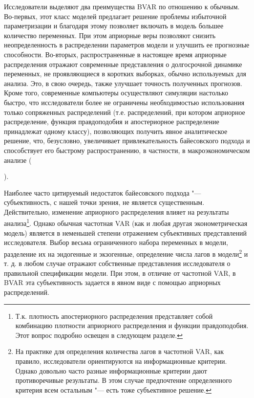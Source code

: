 \documentclass[11pt]{article} %
\newcommand{\eng}[1]{\begin{otherlanguage}{english}#1\end{otherlanguage}}
\begin{document}
 Исследователи выделяют два преимущества BVAR по отношению к обычным. Во-первых, этот класс моделей предлагает решение проблемы избыточной параметризации и благодаря этому позволяет включать в модель большее количество переменных. При этом априорные веры позволяют снизить неопределенность в распределении параметров модели и улучшить ее прогнозные способности. Во-вторых, распространенные в настоящее время  априорные распределения отражают современные представления о  долгосрочной динамике переменных, не проявляющиеся в коротких выборках, обычно используемых для анализа. Это, в свою очередь, также улучшает точность полученных прогнозов. Кроме того, современные компьютеры осуществляют симуляции настолько быстро, что исследователи  более не ограничены необходимостью использования только сопряженных распределений (т.е. распределений, при котором  априорное распределение, функция правдоподобия и апостериорное распределение принадлежат одному классу), позволяющих получить явное аналитическое решение, что, безусловно, увеличивает привлекательность байесовского подхода и способствует его быстрому распространению, в частности, в макроэкономическом анализе (\eng{\cite{karlsson_2012}}).


Наиболее часто цитируемый недостаток байесовского подхода "--- субъективность, с нашей точки зрения, не является существенным. Действительно, изменение априорного распределения влияет на  результаты анализа\footnote{Т.к. плотность апостериорного распределения представляет собой комбинацию плотности априорного распределения и функции правдоподобия. Этот вопрос подробно освещен в следующем разделе.}. Однако обычная частотная VAR (как и любая другая эконометрическая модель) является в неменьшей степени отражением субъективных представлений исследователя. Выбор весьма ограниченного набора переменных в модели, разделение их на эндогенные и экзогенные, определение числа лагов в модели\footnote{На практике для определения количества лагов в частотной VAR, как правило, исследователи ориентируются на информационные критерии. Однако довольно часто разные информационные критерии дают противоречивые результаты. В этом случае предпочтение определенного критерия всем остальным "--- есть тоже субъективное решение.} и т. д. в любом случае отражают собственные представления исследователя о правильной спецификации модели. При этом, в отличие от частотной VAR, в BVAR эта субъективность задается в явном виде с помощью априорных распределений.
\end{document}
